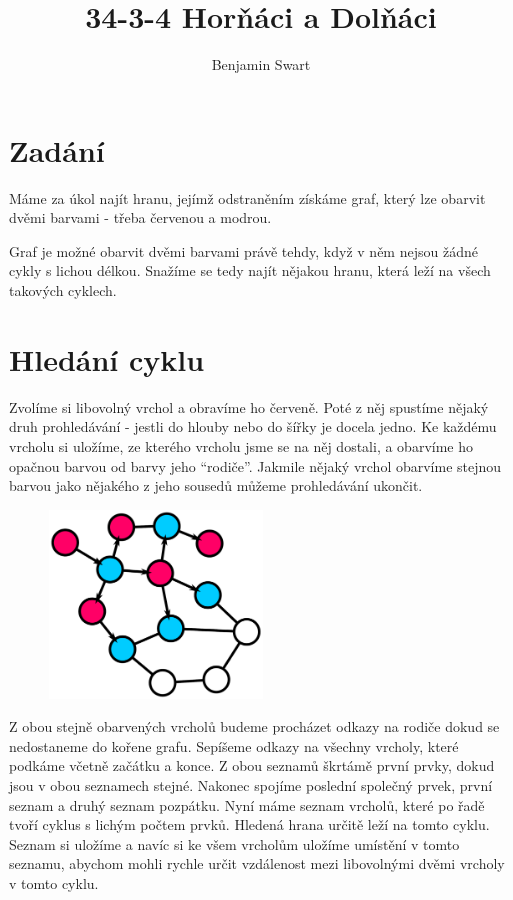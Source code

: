 \documentclass{article}
\title{34-3-4 Horňáci a Dolňáci}
\author{Benjamin Swart}
\begin{document}
\maketitle

\section{Zadání}

Máme za úkol najít hranu, jejímž odstraněním získáme graf, který lze obarvit dvěmi barvami - třeba červenou a modrou.

Graf je možné obarvit dvěmi barvami právě tehdy, když v něm nejsou žádné cykly s lichou délkou. Snažíme se tedy najít nějakou hranu, která leží na všech takových cyklech.

\section{Hledání cyklu}
\label{section:cycle}

Zvolíme si libovolný vrchol a obravíme ho červeně. Poté z něj spustíme nějaký druh prohledávání - jestli do hlouby nebo do šířky je docela jedno. Ke každému vrcholu si uložíme, ze kterého vrcholu jsme se na něj dostali, a obarvíme ho opačnou barvou od barvy jeho \enquote{rodiče}. Jakmile nějaký vrchol obarvíme stejnou barvou jako nějakého z jeho sousedů můžeme prohledávání ukončit.

\begin{figure}[H]
    \centering
    \includegraphics[height=5cm]{graph/colored.pdf}
\end{figure}

Z obou stejně obarvených vrcholů budeme procházet odkazy na rodiče dokud se nedostaneme do kořene grafu. Sepíšeme odkazy na všechny vrcholy, které podkáme včetně začátku a konce. Z obou seznamů škrtámě první prvky, dokud jsou v obou seznamech stejné. Nakonec spojíme poslední společný prvek, první seznam a druhý seznam pozpátku. Nyní máme seznam vrcholů, které po řadě tvoří cyklus s lichým počtem prvků. Hledená hrana určitě leží na tomto cyklu. Seznam si uložíme a navíc si ke všem vrcholům uložíme umístění v tomto seznamu, abychom mohli rychle určit vzdálenost mezi libovolnými dvěmi vrcholy v tomto cyklu.
\end{document}

